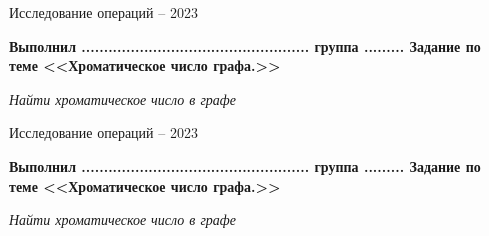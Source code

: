 \documentclass[a4paper,12pt]{article}
\begin{document}
             \begin{center} 
             Исследование операций --  2023 
            \end{center}
            \newline 
            \begin{center}
            \textbf{Выполнил ................................................... группа .........   Задание по теме <<Хроматическое число графа.>> }
            \end{center}
            \begin{flushleft} 
            \begin{center}     
            \textit{Найти хроматическое число в графе} 
            \end{center}
            \end{flushleft}

             \begin{center} 
             Исследование операций --  2023 
            \end{center}
            \newline 
            \begin{center}
            \textbf{Выполнил ................................................... группа .........   Задание по теме <<Хроматическое число графа.>> }
            \end{center}
            \begin{flushleft} 
            \begin{center}     
            \textit{Найти хроматическое число в графе} 
            \end{center}
            \end{flushleft}
\end{document}
